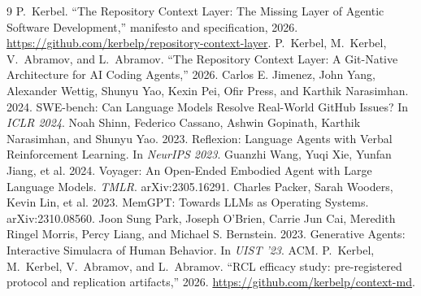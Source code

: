 \documentclass[sigconf,nonacm]{acmart}
\newcommand{\artifact}{\url{https://github.com/kerbelp/context-md}}
\begin{document}
\begin{thebibliography}{9}
 P.~Kerbel. ``The Repository Context Layer: The Missing Layer
of Agentic Software Development,'' manifesto and specification, 2026.
\url{https://github.com/kerbelp/repository-context-layer}.
 P.~Kerbel, M.~Kerbel, V.~Abramov, and L.~Abramov. ``The Repository
Context Layer: A Git-Native Architecture for AI Coding Agents,'' 2026.
 Carlos E. Jimenez, John Yang, Alexander Wettig, Shunyu Yao,
Kexin Pei, Ofir Press, and Karthik Narasimhan. 2024. SWE-bench: Can Language
Models Resolve Real-World GitHub Issues? In \emph{ICLR 2024}.
 Noah Shinn, Federico Cassano, Ashwin Gopinath, Karthik
Narasimhan, and Shunyu Yao. 2023. Reflexion: Language Agents with Verbal
Reinforcement Learning. In \emph{NeurIPS 2023}.
 Guanzhi Wang, Yuqi Xie, Yunfan Jiang, et al. 2024. Voyager: An
Open-Ended Embodied Agent with Large Language Models. \emph{TMLR}. arXiv:2305.16291.
 Charles Packer, Sarah Wooders, Kevin Lin, et al. 2023. MemGPT:
Towards LLMs as Operating Systems. arXiv:2310.08560.
 Joon Sung Park, Joseph O'Brien, Carrie Jun Cai, Meredith
Ringel Morris, Percy Liang, and Michael S. Bernstein. 2023. Generative Agents:
Interactive Simulacra of Human Behavior. In \emph{UIST '23}. ACM.
 P.~Kerbel, M.~Kerbel, V.~Abramov, and L.~Abramov. ``RCL
efficacy study: pre-registered protocol and replication artifacts,'' 2026.
\artifact.
\end{thebibliography}
\end{document}
